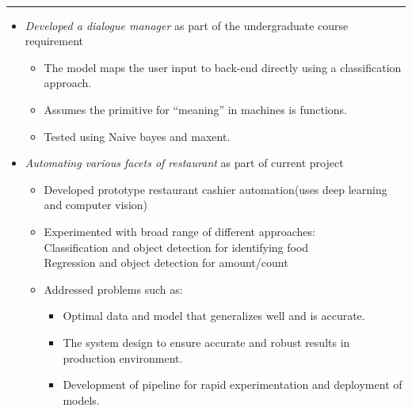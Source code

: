 \documentclass[a4paper,11pt]{article}
\begin{document}
\vspace{15pt}
\noindent\textbf{\color{MidnightBlue}\large{}}
\vspace{-8pt}\noindent\\\rule{0.75\textwidth}{0.4pt}
\begin{itemize}
  \setlength\itemsep{-1pt}
\item \emph{Developed a dialogue manager} as part of the undergraduate course requirement%
  \vspace{-3pt}
  \begin{itemize}
    \setlength\itemsep{-3pt}
  \item The model maps the user input to back-end directly using a classification approach.
  \item Assumes the primitive for ``meaning'' in machines is functions.
  \item Tested using Naive bayes and maxent.
  \end{itemize}
\item \emph{Automating various facets of restaurant} as part of current project%
  \vspace{-3pt}
  \begin{itemize}
    \setlength\itemsep{-3pt}
  \item Developed prototype restaurant cashier automation(uses deep learning and computer vision)
  \item Experimented with broad range of different approaches:
    \\Classification and object detection for identifying food
    \\Regression and object detection for amount/count
  \item Addressed problems such as:
    \vspace{-3pt}
    \begin{itemize}
      \setlength\itemsep{-3pt}
    \item Optimal data and model that generalizes well and is accurate.
    \item The system design to ensure accurate and robust results in production environment.
    \item Development of pipeline for rapid experimentation and deployment of models.
    \end{itemize}
  \end{itemize}
\end{itemize}
\end{document}
